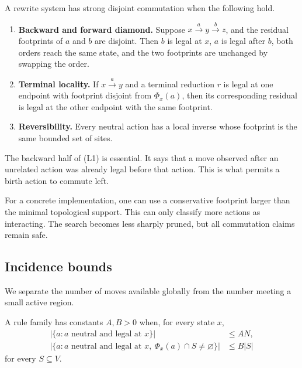 \begin{definition}
A rewrite system has strong disjoint commutation when the following hold.
\begin{enumerate}[label=(L\arabic*)]
\item \textbf{Backward and forward diamond.}  Suppose
      $x\xrightarrow{a}y\xrightarrow{b}z$, and the residual footprints of $a$
      and $b$ are disjoint.  Then $b$ is legal at $x$, $a$ is legal after $b$,
      both orders reach the same state, and the two footprints are unchanged by
      swapping the order.
\item \textbf{Terminal locality.}  If
      $x\xrightarrow{a}y$ and a terminal reduction $r$ is legal at one endpoint
      with footprint disjoint from $\Phi_x(a)$, then its corresponding residual
      is legal at the other endpoint with the same footprint.
\item \textbf{Reversibility.}  Every neutral action has a local inverse whose
      footprint is the same bounded set of sites.
\end{enumerate}
\end{definition}

The backward half of (L1) is essential.  It says that a move observed after an
unrelated action was already legal before that action.  This is what permits a
birth action to commute left.

\begin{remark}
For a concrete implementation, one can use a conservative footprint larger than
the minimal topological support.  This can only classify more actions as
interacting.  The search becomes less sharply pruned, but all commutation claims
remain safe.
\end{remark}

\subsection{Incidence bounds}

We separate the number of moves available globally from the number meeting a
small active region.

\begin{definition}
A rule family has constants $A,B>0$ when, for every state $x$,
\begin{align*}
  |\{a:a\text{ neutral and legal at }x\}| &\leq AN, \\
  |\{a:a\text{ neutral and legal at }x,
      \ \Phi_x(a)\cap S\neq\varnothing\}| &\leq B|S|
\end{align*}
for every $S\subseteq V$.
\end{definition}

